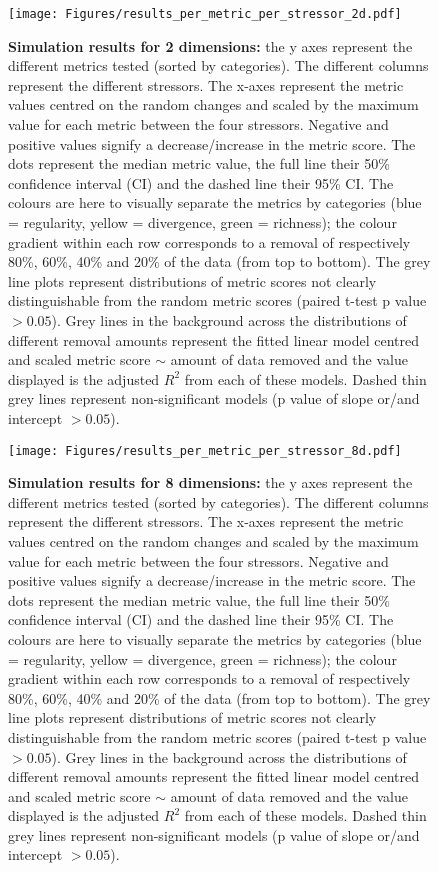 \documentclass[12pt,letterpaper]{article}
\begin{document}
\begin{figure}[!htbp]
\centering
   \texttt{[image: Figures/results\_per\_metric\_per\_stressor\_2d.pdf]}
\caption{\scriptsize{\textbf{Simulation results for 2 dimensions:} the y axes represent the different metrics tested (sorted by categories).
The different columns represent the different stressors. The x-axes represent the metric values centred on the random changes and scaled by the maximum value for each metric between the four stressors.
Negative and positive values signify a decrease/increase in the metric score.
The dots represent the median metric value, the full line their 50\% confidence interval (CI) and the dashed line their 95\% CI.
The colours are here to visually separate the metrics by categories (blue = regularity, yellow = divergence, green = richness); the colour gradient within each row corresponds to a removal of respectively 80\%, 60\%, 40\% and 20\% of the data (from top to bottom).
The grey line plots represent distributions of metric scores not clearly distinguishable from the random metric scores (paired t-test p value $> 0.05$).
Grey lines in the background across the distributions of different removal amounts represent the fitted linear model centred and scaled metric score $\sim$ amount of data removed and the value displayed is the adjusted $R^2$ from each of these models.
Dashed thin grey lines represent non-significant models (p value of slope or/and intercept $> 0.05$).
}}
\label{Fig:simulation_results}
\end{figure}
\bigskip


\begin{figure}[!htbp]
\centering
   \texttt{[image: Figures/results\_per\_metric\_per\_stressor\_8d.pdf]}
\caption{\scriptsize{\textbf{Simulation results for 8 dimensions:} the y axes represent the different metrics tested (sorted by categories).
The different columns represent the different stressors. The x-axes represent the metric values centred on the random changes and scaled by the maximum value for each metric between the four stressors.
Negative and positive values signify a decrease/increase in the metric score.
The dots represent the median metric value, the full line their 50\% confidence interval (CI) and the dashed line their 95\% CI.
The colours are here to visually separate the metrics by categories (blue = regularity, yellow = divergence, green = richness); the colour gradient within each row corresponds to a removal of respectively 80\%, 60\%, 40\% and 20\% of the data (from top to bottom).
The grey line plots represent distributions of metric scores not clearly distinguishable from the random metric scores (paired t-test p value $> 0.05$).
Grey lines in the background across the distributions of different removal amounts represent the fitted linear model centred and scaled metric score $\sim$ amount of data removed and the value displayed is the adjusted $R^2$ from each of these models.
Dashed thin grey lines represent non-significant models (p value of slope or/and intercept $> 0.05$).
}}
\label{Fig:simulation_results}
\end{figure}
\bigskip
\end{document}
